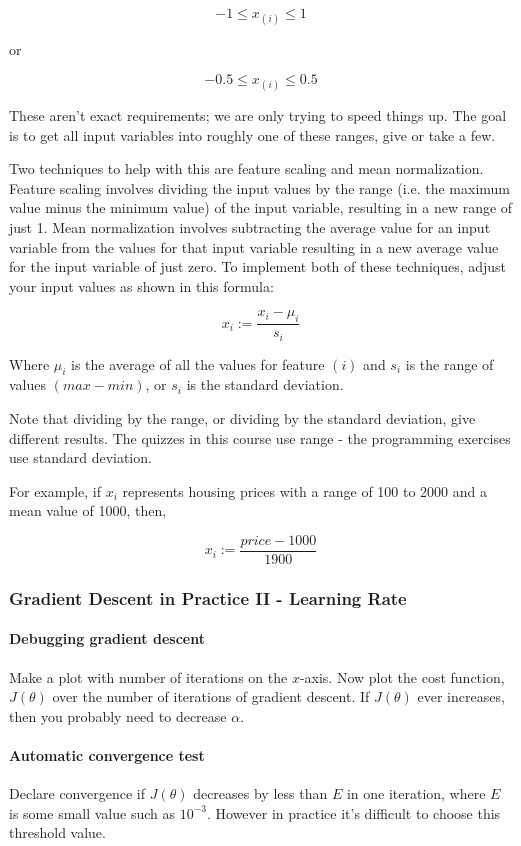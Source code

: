 \documentclass[UTF8]{article}
\begin{document}
\[-1 \le x_{(i)} \le 1\]

or

\[ -0.5 \le x_{(i)} \le 0.5 \]

These aren't exact requirements; we are only trying to speed things up. The goal is to get all input variables into roughly one of these ranges, give or take a few.

Two techniques to help with this are feature scaling and mean normalization. Feature scaling involves dividing the input values by the range (i.e. the maximum value minus the minimum value) of the input variable, resulting in a new range of just 1. Mean normalization involves subtracting the average value for an input variable from the values for that input variable resulting in a new average value for the input variable of just zero. To implement both of these techniques, adjust your input values as shown in this formula:

\[ x_i := \dfrac{x_i - \mu_i}{s_i} \]

Where $\mu_i$ is the average of all the values for feature $(i)$ and $s_i$ is the range of values $(max - min)$, or $s_i$ is the standard deviation.

Note that dividing by the range, or dividing by the standard deviation, give different results. The quizzes in this course use range - the programming exercises use standard deviation.

For example, if $x_i$ represents housing prices with a range of 100 to 2000 and a mean value of 1000, then, 

\[ x_i := \dfrac{price-1000}{1900} \]

\subsubsection{Gradient Descent in Practice II - Learning Rate}

\paragraph{Debugging gradient descent} Make a plot with number of iterations on the $x$-axis. Now plot the cost function, $J(\theta)$ over the number of iterations of gradient descent. If $J(\theta)$ ever increases, then you probably need to decrease $\alpha$.

\paragraph{Automatic convergence test} Declare convergence if $J(\theta)$ decreases by less than $E$ in one iteration, where $E$ is some small value such as $10^{-3}$. However in practice it's difficult to choose this threshold value.
\end{document}
